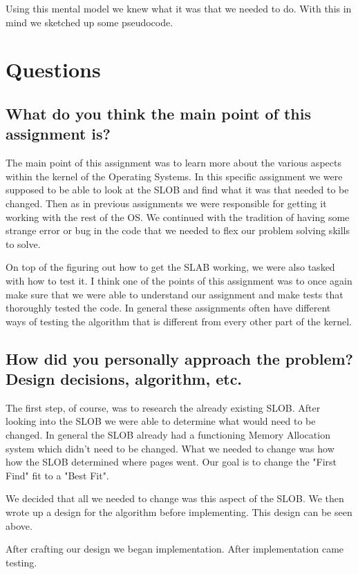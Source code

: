 \documentclass[letterpaper,10pt,titlepage]{article}
\begin{document}
Using this mental model we knew what it was that we needed to do.
With this in mind we sketched up some pseudocode.

\section{Questions}
\subsection{What do you think the main point of this assignment is?}

 \sloppy The main point of this assignment was to learn more about the various aspects within the kernel of the Operating Systems.
 In this specific assignment we were supposed to be able to look at the SLOB and find what it was that needed to be changed.
 Then as in previous assignments we were responsible for getting it working with the rest of the OS.
 We continued with the tradition of having some strange error or bug in the code that we needed to flex our problem solving skills to solve.

\sloppy On top of the figuring out how to get the SLAB working, we were also tasked with how to test it.
I think one of the points of this assignment was to once again make sure that we were able to understand our assignment and make tests that thoroughly tested the code.
In general these assignments often have different ways of testing the algorithm that is different from every other part of the kernel.

\subsection{How did you personally approach the problem? Design decisions, algorithm, etc.}

\sloppy The first step, of course, was to research the already existing SLOB. 
After looking into the SLOB we were able to determine what would need to be changed. 
In general the SLOB already had a functioning Memory Allocation system which didn't need to be changed. 
What we needed to change was how how the SLOB determined where pages went. Our goal is to change the "First Find" fit to a "Best Fit".

\sloppy We decided that all we needed to change was this aspect of the SLOB. 
We then wrote up a design for the algorithm before implementing.
This design can be seen above.

\sloppy After crafting our design we began implementation.
After implementation came testing.
\end{document}
